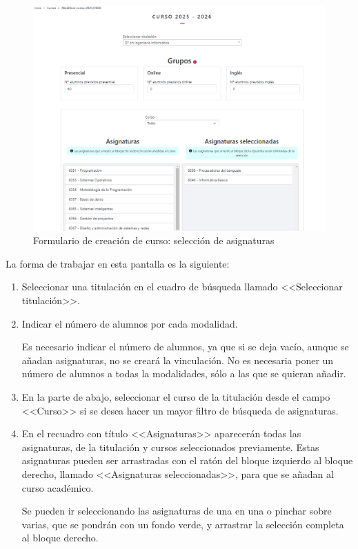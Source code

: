 \begin{figure}
	\centering
	\includegraphics[width=\textwidth]{../img/Anexos/Manual usuario/formCurso2.png}
	\caption{Formulario de creación de curso: selección de asignaturas}\label{pag:formCurso2}
\end{figure}

La forma de trabajar en esta pantalla es la siguiente: 
\begin{enumerate}
\item Seleccionar una titulación en el cuadro de búsqueda llamado <<Seleccionar titulación>>.
\item Indicar el número de alumnos por cada modalidad.

Es necesario indicar el número de alumnos, ya que si se deja vacío, aunque se añadan asignaturas, no se creará la vinculación. No es necesaria poner un número de alumnos a todas la modalidades, sólo a las que se quieran añadir.
\item En la parte de abajo, seleccionar el curso de la titulación desde el campo <<Curso>> si se desea hacer un mayor filtro de búsqueda de asignaturas.
\item En el recuadro con título <<Asignaturas>> aparecerán todas las asignaturas, de la titulación y cursos seleccionados previamente.
Estas asignaturas pueden ser arrastradas con el ratón del bloque izquierdo al bloque derecho, llamado <<Asignaturas seleccionadas>>, para que se añadan al curso académico.

Se pueden ir seleccionando las asignaturas de una en una o pinchar sobre varias, que se pondrán con un fondo verde, y arrastrar la selección completa al bloque derecho.
\end{enumerate}

